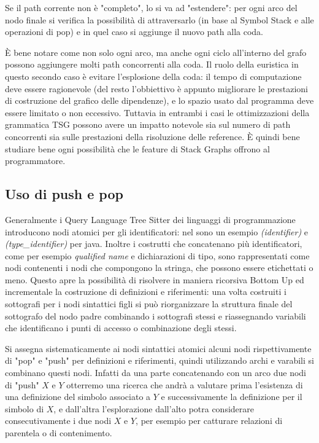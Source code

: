 \par
Se il path corrente non \`e "completo", lo si va ad "estendere": per ogni arco del nodo finale si verifica la possibilit\`a di attraversarlo (in base al Symbol Stack e alle operazioni di pop) e in quel caso si aggiunge il nuovo path alla coda.

\par
\`E bene notare come non solo ogni arco, ma anche ogni ciclo all'interno del grafo possono aggiungere molti path concorrenti alla coda.
Il ruolo della euristica in questo secondo caso \`e evitare l'esplosione della coda: il tempo di computazione deve essere ragionevole (del resto l'obbiettivo \`e appunto migliorare le prestazioni di costruzione del grafico delle dipendenze), e lo spazio usato dal programma deve essere limitato o non eccessivo.
Tuttavia in entrambi i casi le ottimizzazioni della grammatica TSG possono avere un impatto notevole sia sul numero di path concorrenti sia sulle prestazioni della risoluzione delle reference. \`E quindi bene studiare bene ogni possibilit\`a che le feature di Stack Graphs offrono al programmatore.

\subsection{Uso di push e pop}

Generalmente i Query Language Tree Sitter dei linguaggi di programmazione introducono nodi atomici per gli identificatori: nel sono un esempio \emph{(identifier)} e \emph{(type\_identifier)} per java.
Inoltre i costrutti che concatenano pi\`u identificatori, come per esempio \emph{qualified name} e dichiarazioni di tipo, sono rappresentati come nodi contenenti i nodi che compongono la stringa, che possono essere etichettati o meno.
Questo apre la possibilit\`a di risolvere in maniera ricorsiva Bottom Up ed incrementale la costruzione di definizioni e riferimenti: una volta costruiti i sottografi per i nodi sintattici figli si pu\`o riorganizzare la struttura finale del sottografo del nodo padre combinando i sottografi stessi e riassegnando variabili che identificano i punti di accesso o combinazione degli stessi.

\par
Si assegna sistematicamente ai nodi sintattici atomici alcuni nodi rispettivamente di "pop" e "push" per definizioni e riferimenti, quindi utilizzando archi e varabili si combinano questi nodi.
Infatti da una parte concatenando con un arco due nodi di "push" $X$ e $Y$ otterremo una ricerca che andr\`a a valutare prima l'esistenza di una definizione del simbolo associato a $Y$ e successivamente la definizione per il simbolo di $X$, e dall'altra l'esplorazione dall'alto potra considerare consecutivamente i due nodi $X$ e $Y$, per esempio per catturare relazioni di parentela o di contenimento.

